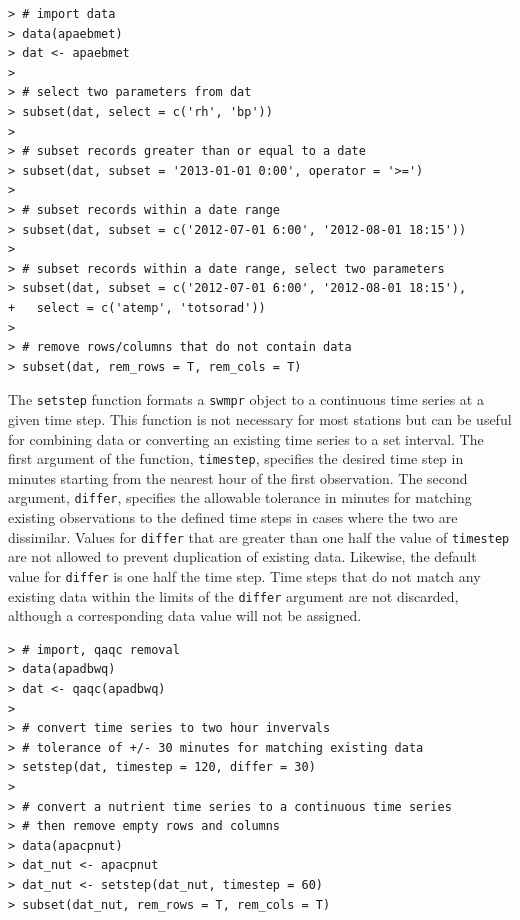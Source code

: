 \documentclass[10pt,letterpaper]{article}\usepackage[]{graphicx}\usepackage[]{color}
\makeatletter
\newenvironment{kframe}{%
 \def\at@end@of@kframe{}%
 \ifinner\ifhmode%
  \def\at@end@of@kframe{\end{minipage}}%
  \begin{minipage}{\columnwidth}%
 \fi\fi%
 \def\FrameCommand##1{\hskip\@totalleftmargin \hskip-\fboxsep
 \colorbox{shadecolor}{##1}\hskip-\fboxsep
     \hskip-\linewidth \hskip-\@totalleftmargin \hskip\columnwidth}%
 \MakeFramed {\advance\hsize-\width
   \@totalleftmargin\z@ \linewidth\hsize
   \@setminipage}}%
 {\par\unskip\endMakeFramed%
 \at@end@of@kframe}
\newenvironment{knitrout}{}{} %
\makeatother
\begin{document}
\begin{knitrout}\small
{}\color{fgcolor}\begin{kframe}
\begin{verbatim}
> # import data
> data(apaebmet)
> dat <- apaebmet
> 
> # select two parameters from dat
> subset(dat, select = c('rh', 'bp'))
> 
> # subset records greater than or equal to a date
> subset(dat, subset = '2013-01-01 0:00', operator = '>=')
> 
> # subset records within a date range
> subset(dat, subset = c('2012-07-01 6:00', '2012-08-01 18:15'))
> 
> # subset records within a date range, select two parameters
> subset(dat, subset = c('2012-07-01 6:00', '2012-08-01 18:15'),
+   select = c('atemp', 'totsorad'))
> 
> # remove rows/columns that do not contain data
> subset(dat, rem_rows = T, rem_cols = T)
\end{verbatim}
\end{kframe}
\end{knitrout}

The \texttt{setstep} function formats a \texttt{swmpr} object to a continuous time series at a given time step.  This function is not necessary for most stations but can be useful for combining data or converting an existing time series to a set interval.  The first argument of the function, \texttt{timestep}, specifies the desired time step in minutes starting from the nearest hour of the first observation.  The second argument, \texttt{differ}, specifies the allowable tolerance in minutes for matching existing observations to the defined time steps in cases where the two are dissimilar.  Values for \texttt{differ} that are greater than one half the value of \texttt{timestep} are not allowed to prevent duplication of existing data.  Likewise, the default value for \texttt{differ} is one half the time step.  Time steps that do not match any existing data within the limits of the \texttt{differ} argument are not discarded, although a corresponding data value will not be assigned.

\begin{knitrout}\small
{}\color{fgcolor}\begin{kframe}
\begin{verbatim}
> # import, qaqc removal
> data(apadbwq)
> dat <- qaqc(apadbwq)
> 
> # convert time series to two hour invervals
> # tolerance of +/- 30 minutes for matching existing data
> setstep(dat, timestep = 120, differ = 30)
> 
> # convert a nutrient time series to a continuous time series
> # then remove empty rows and columns
> data(apacpnut)
> dat_nut <- apacpnut
> dat_nut <- setstep(dat_nut, timestep = 60)
> subset(dat_nut, rem_rows = T, rem_cols = T)
\end{verbatim}
\end{kframe}
\end{knitrout}
\end{document}

